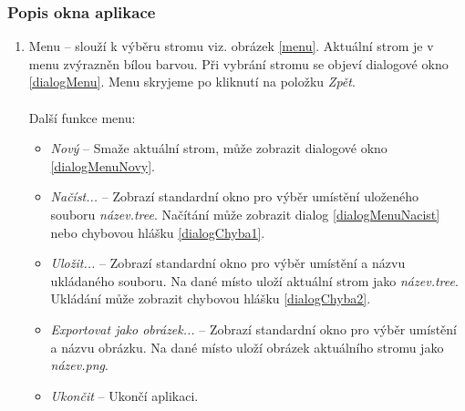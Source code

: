 \documentclass[
  biblatex=false,
  font=serif,
  glossaries=false,
  tables=false,
  theorems=false,
  index
]{kidiplom}
\begin{document}
\subsubsection{Popis okna aplikace} 
\begin{enumerate}
\item Menu -- slouží k výběru stromu viz. obrázek \ref{menu}. Aktuální strom je v menu zvýrazněn bílou barvou. Při vybrání stromu se objeví dialogové okno \ref{dialogMenu}. Menu skryjeme po kliknutí na položku \textit{Zpět}.\\\\
\noindent Další funkce menu:
\begin{itemize}
\item \textit{Nový} -- Smaže aktuální strom, může zobrazit dialogové okno \ref{dialogMenuNovy}.
\item \textit{Načíst...} -- Zobrazí standardní okno pro výběr umístění uloženého souboru \textit{název.tree}. Načítání může zobrazit dialog \ref{dialogMenuNacist} nebo chybovou hlášku \ref{dialogChyba1}.
\item \textit{Uložit...} -- Zobrazí standardní okno pro výběr umístění a názvu ukládaného souboru. Na dané místo uloží aktuální strom jako \textit{název.tree}. Ukládání může zobrazit chybovou hlášku \ref{dialogChyba2}. 
\item \textit{Exportovat jako obrázek...} -- Zobrazí standardní okno pro výběr umístění a názvu obrázku. Na dané místo uloží obrázek aktuálního stromu jako \textit{název.png}.
\item \textit{Ukončit} -- Ukončí aplikaci.
\end{itemize}


\end{enumerate}
\end{document}
